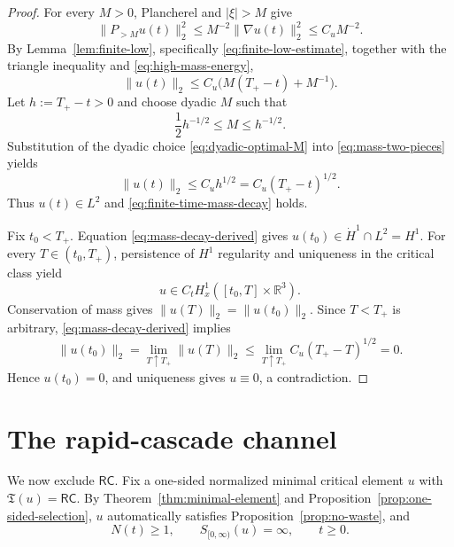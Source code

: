 \documentclass{interact}
\numberwithin{equation}{section}
\theoremstyle{plain}
\theoremstyle{definition}
\theoremstyle{remark}
\newcommand{\R}{\mathbb R}
\begin{document}
\begin{proof}
For every $M>0$, Plancherel and $|\xi|>M$ give
\begin{equation}\label{eq:high-mass-energy}
 \|P_{>M}u(t)\|_2^2
 \le M^{-2}\|\nabla u(t)\|_2^2
 \le C_uM^{-2}.
\end{equation}
By Lemma~\ref{lem:finite-low}, specifically \eqref{eq:finite-low-estimate}, together with the triangle inequality and \eqref{eq:high-mass-energy},
\begin{equation}\label{eq:mass-two-pieces}
 \|u(t)\|_2
 \le C_u\bigl(M(T_+-t)+M^{-1}\bigr).
\end{equation}
Let $h:=T_+-t>0$ and choose dyadic $M$ such that
\begin{equation}\label{eq:dyadic-optimal-M}
 \frac12h^{-1/2}\le M\le h^{-1/2}.
\end{equation}
Substitution of the dyadic choice \eqref{eq:dyadic-optimal-M} into \eqref{eq:mass-two-pieces} yields
\begin{equation}\label{eq:mass-decay-derived}
 \|u(t)\|_2\le C_uh^{1/2}
 =C_u(T_+-t)^{1/2}.
\end{equation}
Thus $u(t)\in L^2$ and \eqref{eq:finite-time-mass-decay} holds.

Fix $t_0<T_+$. Equation \eqref{eq:mass-decay-derived} gives $u(t_0)\in\dot H^1\cap L^2=H^1$. For every $T\in(t_0,T_+)$, persistence of $H^1$ regularity and uniqueness in the critical class yield
\[
 u\in C_tH_x^1([t_0,T]\times\R^3).
\]
Conservation of mass gives $\|u(T)\|_2=\|u(t_0)\|_2$. Since $T<T_+$ is arbitrary, \eqref{eq:mass-decay-derived} implies
\[
 \|u(t_0)\|_2
 =\lim_{T\uparrow T_+}\|u(T)\|_2
 \le\lim_{T\uparrow T_+}C_u(T_+-T)^{1/2}=0.
\]
Hence $u(t_0)=0$, and uniqueness gives $u\equiv0$, a contradiction.
\end{proof}

\section{The rapid-cascade channel}

We now exclude $\mathsf{RC}$. Fix a one-sided normalized minimal critical element $u$ with $\mathfrak T(u)=\mathsf{RC}$. By Theorem~\ref{thm:minimal-element} and Proposition~\ref{prop:one-sided-selection}, $u$ automatically satisfies Proposition~\ref{prop:no-waste}, and
\begin{equation}\label{eq:N-ge-one}
 N(t)\ge1,
 \qquad
 S_{[0,\infty)}(u)=\infty,
 \qquad t\ge0.
\end{equation}
\end{document}
